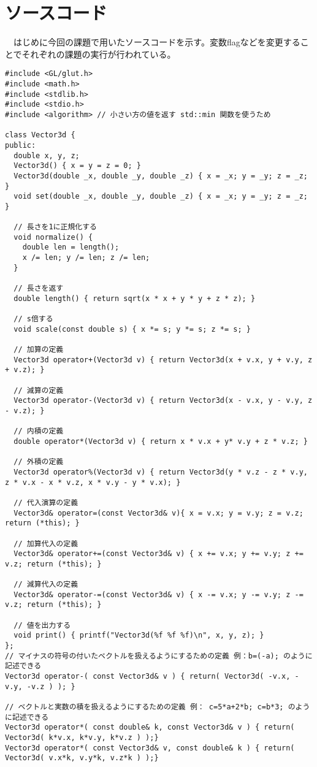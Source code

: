 \documentclass{scrartcl}
\begin{document}
\section{ソースコード}
\label{sec:orgedeff83}
　はじめに今回の課題で用いたソースコードを示す。変数flagなどを変更することでそれぞれの課題の実行が行われている。\\
\begin{verbatim}
#include <GL/glut.h>
#include <math.h>
#include <stdlib.h>
#include <stdio.h>
#include <algorithm> // 小さい方の値を返す std::min 関数を使うため

class Vector3d {
public:
  double x, y, z;
  Vector3d() { x = y = z = 0; }
  Vector3d(double _x, double _y, double _z) { x = _x; y = _y; z = _z; }
  void set(double _x, double _y, double _z) { x = _x; y = _y; z = _z; }

  // 長さを1に正規化する
  void normalize() {
    double len = length();
    x /= len; y /= len; z /= len;
  }

  // 長さを返す
  double length() { return sqrt(x * x + y * y + z * z); }

  // s倍する
  void scale(const double s) { x *= s; y *= s; z *= s; }

  // 加算の定義
  Vector3d operator+(Vector3d v) { return Vector3d(x + v.x, y + v.y, z + v.z); }

  // 減算の定義
  Vector3d operator-(Vector3d v) { return Vector3d(x - v.x, y - v.y, z - v.z); }

  // 内積の定義
  double operator*(Vector3d v) { return x * v.x + y* v.y + z * v.z; }

  // 外積の定義
  Vector3d operator%(Vector3d v) { return Vector3d(y * v.z - z * v.y, z * v.x - x * v.z, x * v.y - y * v.x); }

  // 代入演算の定義
  Vector3d& operator=(const Vector3d& v){ x = v.x; y = v.y; z = v.z; return (*this); }

  // 加算代入の定義
  Vector3d& operator+=(const Vector3d& v) { x += v.x; y += v.y; z += v.z; return (*this); }

  // 減算代入の定義
  Vector3d& operator-=(const Vector3d& v) { x -= v.x; y -= v.y; z -= v.z; return (*this); }

  // 値を出力する
  void print() { printf("Vector3d(%f %f %f)\n", x, y, z); }
};
// マイナスの符号の付いたベクトルを扱えるようにするための定義 例：b=(-a); のように記述できる
Vector3d operator-( const Vector3d& v ) { return( Vector3d( -v.x, -v.y, -v.z ) ); }

// ベクトルと実数の積を扱えるようにするための定義 例： c=5*a+2*b; c=b*3; のように記述できる
Vector3d operator*( const double& k, const Vector3d& v ) { return( Vector3d( k*v.x, k*v.y, k*v.z ) );}
Vector3d operator*( const Vector3d& v, const double& k ) { return( Vector3d( v.x*k, v.y*k, v.z*k ) );}


\end{verbatim}
\end{document}
